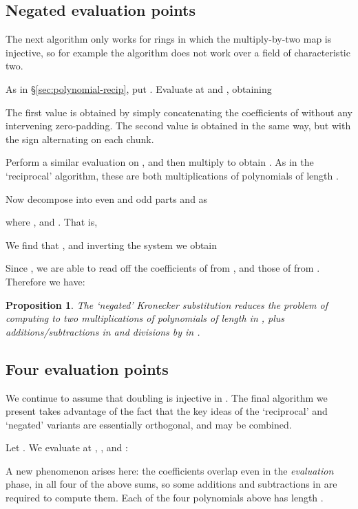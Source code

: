 \documentclass{amsart}
\newtheorem{prop}[thm]{Proposition}
\theoremstyle{definition}
\theoremstyle{remark}
\begin{document}
\subsection{Negated evaluation points}
\label{sec:polynomial-negate}

The next algorithm only works for rings in which the multiply-by-two map is injective, so for example the algorithm does not work over a field of characteristic two.

As in \S\ref{sec:polynomial-recip}, put . Evaluate at  and , obtaining
 
The first value is obtained by simply concatenating the coefficients of  without any intervening zero-padding. The second value is obtained in the same way, but with the sign alternating on each chunk.

Perform a similar evaluation on , and then multiply to obtain . As in the `reciprocal' algorithm, these are both multiplications of polynomials of length .

Now decompose  into even and odd parts  and  as
  
where ,  and . That is,
 
We find that , and inverting the system we obtain

Since , we are able to read off the coefficients of  from , and those of  from . Therefore we have:
\begin{prop}
\label{prop:polynomial-negate-ks}
The `negated' Kronecker substitution reduces the problem of computing  to two multiplications of polynomials of length  in , plus  additions/subtractions in  and  divisions by  in .
\end{prop}


\subsection{Four evaluation points}
\label{sec:polynomial-four}

We continue to assume that doubling is injective in . The final algorithm we present takes advantage of the fact that the key ideas of the `reciprocal' and `negated' variants are essentially orthogonal, and may be combined.

Let . We evaluate at , ,  and :

A new phenomenon arises here: the coefficients  overlap even in the \emph{evaluation} phase, in all four of the above sums, so some additions and subtractions in  are required to compute them. Each of the four polynomials above has length .
\end{document}
